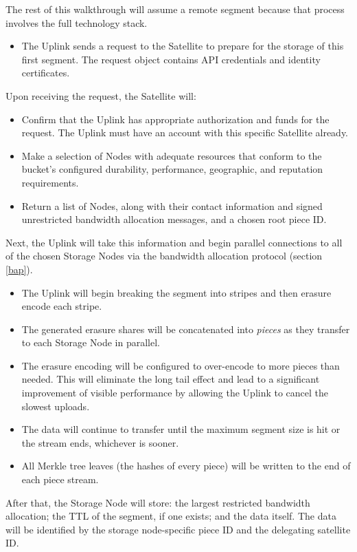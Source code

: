 \documentclass[8pt,fleqn,openany]{book}
\begin{document}
The rest of this
walkthrough will assume a remote segment because that process involves the
full technology stack.
\begin{itemize}
    \item The Uplink sends a request to the Satellite to prepare for the storage
of this first segment. The request object contains API credentials and identity
certificates.
\end{itemize}

Upon receiving the request, the Satellite will:
\begin{itemize}
\item Confirm that the Uplink has appropriate authorization and funds for
  the request. The Uplink must have an account with this specific Satellite
  already.
\item Make a selection of Nodes with adequate resources that conform to the
  bucket's configured durability, performance, geographic, and reputation
  requirements.
\item Return a list of Nodes, along with their contact information and
  signed unrestricted bandwidth allocation messages, and a chosen root piece
  ID.
\end{itemize}

Next, the Uplink will take this information and begin parallel connections to
  all of the chosen Storage Nodes via the bandwidth allocation protocol
  (section \ref{bap}).

\begin{itemize}
\item The Uplink will begin breaking the segment into stripes and then
  erasure encode each stripe.
\item The generated erasure shares will be concatenated into {\em pieces} as they
  transfer to each Storage Node in parallel.
\item The erasure encoding will be configured to over-encode to more pieces
  than needed. This will eliminate the long tail effect and lead to a
  significant improvement of visible performance by allowing the Uplink to
  cancel the slowest uploads.
\item The data will continue to transfer until the maximum segment size is hit
  or the stream ends, whichever is sooner.
\item All Merkle tree leaves (the hashes of every piece) will be written to the
  end of each piece stream.
\end{itemize}

After that, the Storage Node will store: the largest restricted bandwidth allocation;
the TTL of the segment, if one exists; and the data itself. The data will
be identified by the storage node-specific piece ID and the delegating satellite
ID.
\end{document}
